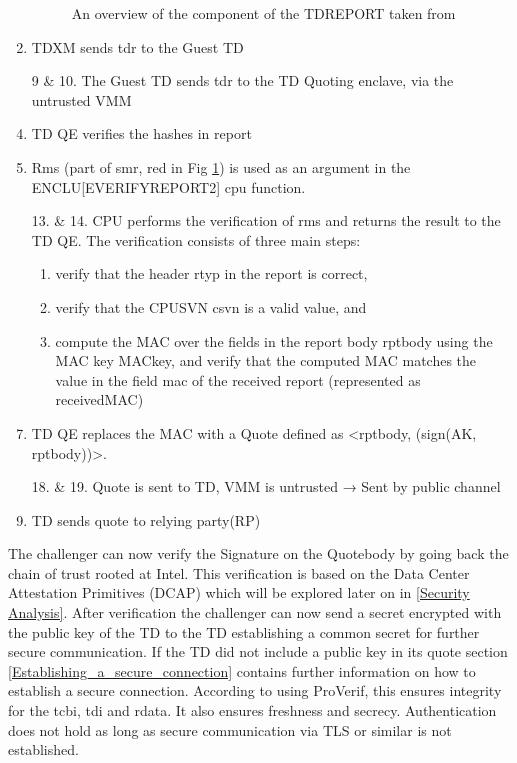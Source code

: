 \begin{enumerate}
\begin{figure}
\caption{An overview of the component of the TDREPORT taken from \cite{sardar_demystifying_2021}}
\label{fig:tdr}
\end{figure}
\item TDXM sends tdr to the Guest TD
\item[9 \& 10.]The Guest TD sends tdr to the TD Quoting enclave, via the untrusted VMM
\item TD QE verifies the hashes in report
\item Rms (part of smr, red in Fig \ref{fig:tdr}) is used as an argument in the ENCLU[EVERIFYREPORT2] cpu function. 
\item[13. \& 14.] CPU performs the verification of rms and returns the result to the TD QE. The verification consists of three main steps: 
\begin{enumerate}
\item verify that the header rtyp in the report is correct, 
\item verify that the CPUSVN csvn is a valid value, and 
\item compute the MAC over the fields in the report body rptbody using the MAC key MACkey, and verify that the computed MAC matches the value in the field mac of the received report (represented as receivedMAC)
\end{enumerate}
\item TD QE replaces the MAC with a Quote defined as <rptbody, (sign(AK, rptbody))>.
\item[18. \& 19.] Quote is sent to TD, VMM is untrusted → Sent by public channel
\item TD sends quote to relying party(RP)
\end{enumerate}
The challenger can now verify the Signature on the Quotebody by going back the chain of trust rooted at Intel. This verification is based on the Data Center Attestation Primitives (DCAP) which will be explored later on in \ref{Security Analysis}. After verification the challenger can now send a secret encrypted with the public key of the TD to the TD establishing a common secret for further secure communication. If the TD did not include a public key in its quote section \ref{Establishing_a_secure_connection} contains further information on how to establish a secure connection. According to \cite{sardar_formal_2023} using ProVerif, this ensures integrity for the tcbi, tdi and rdata. It also ensures freshness and secrecy. Authentication does not hold as long as secure communication via TLS or similar is not established.

